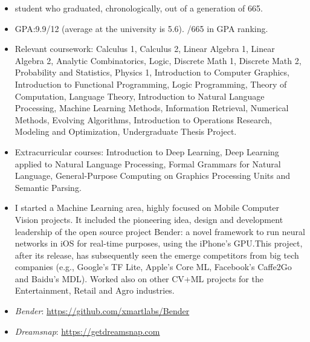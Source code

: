 \documentclass[10pt,a4paper,academicons]{altacv}
\begin{document}
\begin{itemize}
  \item {} student who graduated, chronologically, out of a generation of 665.

  \item GPA:\@ 9.9/12 (average at the university is 5.6). /665 in GPA ranking.

  \item Relevant coursework: Calculus 1, Calculus 2, Linear Algebra 1, Linear Algebra 2, Analytic Combinatorics, Logic, Discrete Math 1, Discrete Math 2, Probability and Statistics, Physics 1, Introduction to Computer Graphics, Introduction to Functional Programming, Logic Programming, Theory of Computation, Language Theory, Introduction to Natural Language Processing, Machine Learning Methods, Information Retrieval, Numerical Methods, Evolving Algorithms, Introduction to Operations Research, Modeling and Optimization, Undergraduate Thesis Project.

  \item Extracurricular courses: Introduction to Deep Learning, Deep Learning applied to Natural
  Language Processing, Formal Grammars for Natural Language, General-Purpose Computing on
  Graphics Processing Units and Semantic Parsing.
\end{itemize}



\begin{itemize}
  \item I started a Machine Learning area, highly focused on Mobile Computer Vision projects. It included the pioneering idea, design and development leadership of the open source project Bender: a novel framework to run neural networks in iOS for real-time purposes, using the iPhone’s GPU.\@ This project, after its release, has subsequently seen the emerge competitors from big tech companies (e.g., Google’s TF Lite, Apple’s Core ML, Facebook’s Caffe2Go and Baidu’s MDL). Worked also on other CV+ML projects for the Entertainment, Retail and Agro industries.
  \item \emph{Bender}: \url{https://github.com/xmartlabs/Bender}
  \item \emph{Dreamsnap}: \url{https://getdreamsnap.com}
\end{itemize}

\end{document}
